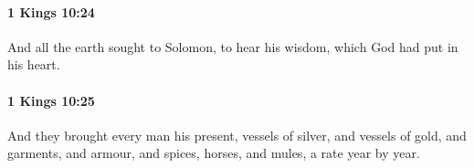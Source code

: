 		\paragraph{1 Kings 10:24} %
			\label{1KINGS-10-24}

			And all the earth sought to Solomon, to hear his wisdom, which God had put in his heart.


		\paragraph{1 Kings 10:25} %
			\label{1KINGS-10-25}

			And they brought every man his present, vessels of silver, and vessels of gold, and garments, and armour, and spices, horses, and mules, a rate year by year.


